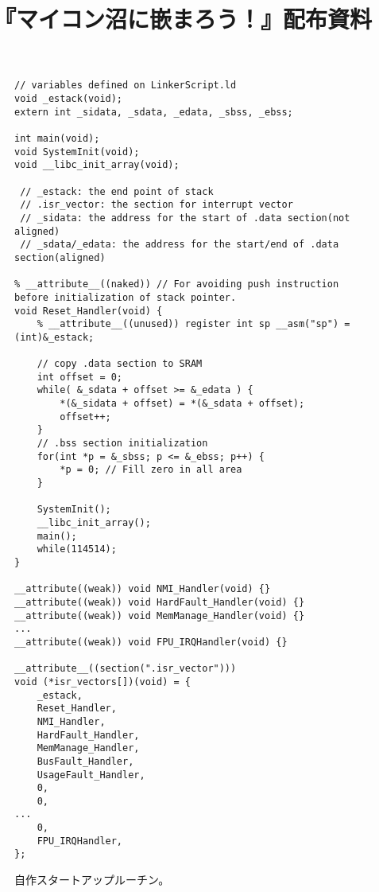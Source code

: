 \documentclass[uplatex]{jsarticle}
\title{\vspace{-3cm}『\textbf{マイコン沼に嵌まろう！}』配布資料\vspace{-1.5cm}}
\author{}
\date{}
\begin{document}
\maketitle
\begin{figure}[H]
	\begin{lstlisting}[style=clang]
// variables defined on LinkerScript.ld
void _estack(void);
extern int _sidata, _sdata, _edata, _sbss, _ebss;

int main(void);
void SystemInit(void);
void __libc_init_array(void);

 // _estack: the end point of stack
 // .isr_vector: the section for interrupt vector
 // _sidata: the address for the start of .data section(not aligned)
 // _sdata/_edata: the address for the start/end of .data section(aligned)

% __attribute__((naked)) // For avoiding push instruction before initialization of stack pointer.
void Reset_Handler(void) {
	% __attribute__((unused)) register int sp __asm("sp") = (int)&_estack;

	// copy .data section to SRAM
	int offset = 0;
	while( &_sdata + offset >= &_edata ) {
		*(&_sidata + offset) = *(&_sdata + offset);
		offset++;
	}
	// .bss section initialization
	for(int *p = &_sbss; p <= &_ebss; p++) {
		*p = 0; // Fill zero in all area
	}

	SystemInit();
	__libc_init_array();
	main();
	while(114514);
}

__attribute((weak)) void NMI_Handler(void) {}
__attribute((weak)) void HardFault_Handler(void) {}
__attribute((weak)) void MemManage_Handler(void) {}
...
__attribute((weak)) void FPU_IRQHandler(void) {}

__attribute__((section(".isr_vector")))
void (*isr_vectors[])(void) = {
	_estack,
	Reset_Handler,
	NMI_Handler,
	HardFault_Handler,
	MemManage_Handler,
	BusFault_Handler,
	UsageFault_Handler,
	0,
	0,
...
	0,
	FPU_IRQHandler,
};
	\end{lstlisting}
	\caption{自作スタートアップルーチン。}
\end{figure}
\end{document}
